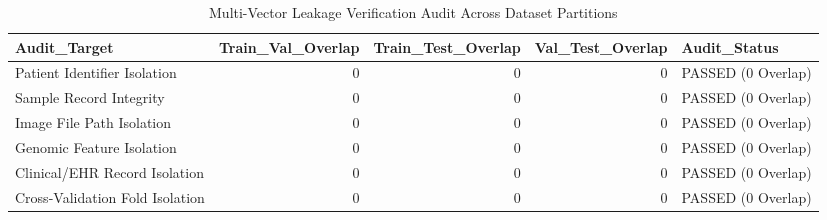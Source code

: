 \begin{table}
\caption{Multi-Vector Leakage Verification Audit Across Dataset Partitions}
\label{tab:table_leakage_validation}
\begin{tabular}{lrrrl}
\toprule
Audit\_Target & Train\_Val\_Overlap & Train\_Test\_Overlap & Val\_Test\_Overlap & Audit\_Status \\
\midrule
Patient Identifier Isolation & 0 & 0 & 0 & PASSED (0 Overlap) \\
Sample Record Integrity & 0 & 0 & 0 & PASSED (0 Overlap) \\
Image File Path Isolation & 0 & 0 & 0 & PASSED (0 Overlap) \\
Genomic Feature Isolation & 0 & 0 & 0 & PASSED (0 Overlap) \\
Clinical/EHR Record Isolation & 0 & 0 & 0 & PASSED (0 Overlap) \\
Cross-Validation Fold Isolation & 0 & 0 & 0 & PASSED (0 Overlap) \\
\bottomrule
\end{tabular}
\end{table}
